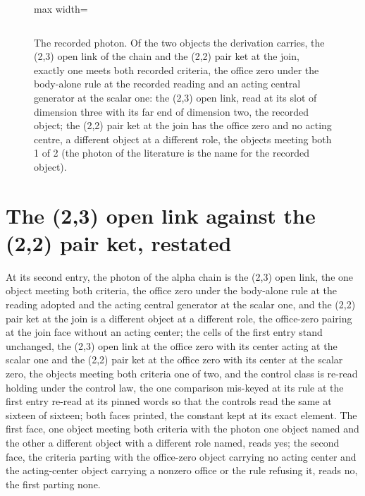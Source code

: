 \begin{figure}[htbp]
{\begin{adjustbox}{max width=\linewidth}
\begin{tabular}{p{52mm}p{52mm}p{52mm}}
\end{tabular}\end{adjustbox}}
\caption{The recorded photon. Of the two objects the derivation carries, the (2,3) open link of the chain and the (2,2) pair ket at the join, exactly one meets both recorded criteria, the office zero under the body-alone rule at the recorded reading and an acting central generator at the scalar one: the (2,3) open link, read at its slot of dimension three with its far end of dimension two, the recorded object; the (2,2) pair ket at the join has the office zero and no acting centre, a different object at a different role, the objects meeting both 1 of 2 (the photon of the literature is the name for the recorded object).}\label{fig:photon-of-record}
\end{figure}
\section{The (2,3) open link against the (2,2) pair ket, restated}\label{mod:V-1-D541950-rpho-t1}
\begin{chtheorem}\label{box:V-1-D541950-rpho-t1:1}
At its second entry, the photon of the alpha chain is the (2,3) open link, the one object meeting both criteria, the office zero under the body-alone rule at the reading adopted and the acting central generator at the scalar one, and the (2,2) pair ket at the join is a different object at a different role, the office-zero pairing at the join face without an acting center; the cells of the first entry stand unchanged, the (2,3) open link at the office zero with its center acting at the scalar one and the (2,2) pair ket at the office zero with its center at the scalar zero, the objects meeting both criteria one of two, and the control class is re-read holding under the control law, the one comparison mis-keyed at its rule at the first entry re-read at its pinned words so that the controls read the same at sixteen of sixteen; both faces printed, the constant kept at its exact element.
The first face, one object meeting both criteria with the photon one object named and the other a different object with a different role named, reads yes; the second face, the criteria parting with the office-zero object carrying no acting center and the acting-center object carrying a nonzero office or the rule refusing it, reads no, the first parting none.
\end{chtheorem}
